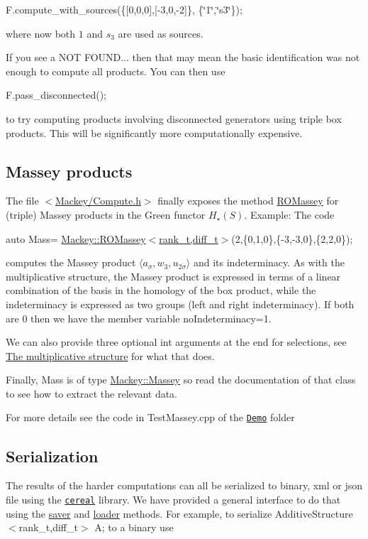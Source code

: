 {\ttfamily F.\+compute\+\_\+with\+\_\+sources(\{\mbox{[}0,0,0\mbox{]},\mbox{[}-\/3,0,-\/2\mbox{]}\}, \{\char`\"{}1\char`\"{},\char`\"{}s3\char`\"{}\});}

where now both $1$ and $s_3$ are used as sources.

If you see a {\ttfamily N\+OT F\+O\+U\+ND...} then that may mean the basic identification was not enough to compute all products. You can then use

{\ttfamily F.\+pass\+\_\+disconnected();}

to try computing products involving disconnected generators using triple box products. This will be significantly more computationally expensive.\hypertarget{use_step1Mass}{}\subsection{Massey products}\label{use_step1Mass}
The file {\ttfamily $<$\hyperlink{Compute_8h}{Mackey/\+Compute.\+h}$>$} finally exposes the method \hyperlink{namespaceMackey_ab75d7bcfa2d92d01bea0d5eef9f48398}{R\+O\+Massey} for (triple) Massey products in the Green functor $H_{\star}(S)$. Example\+: The code

{\ttfamily auto Mass= \hyperlink{namespaceMackey_ab75d7bcfa2d92d01bea0d5eef9f48398}{Mackey\+::\+R\+O\+Massey$<$rank\+\_\+t,diff\+\_\+t$>$}(2,\{0,1,0\},\{-\/3,-\/3,0\},\{2,2,0\});}

computes the Massey product $\langle a_{\sigma},w_3,u_{2\sigma}\rangle $ and its indeterminacy. As with the multiplicative structure, the Massey product is expressed in terms of a linear combination of the basis in the homology of the box product, while the indeterminacy is expressed as two groups (left and right indeterminacy). If both are $0$ then we have the member variable {\ttfamily no\+Indeterminacy=1}.

We can also provide three optional {\ttfamily int} arguments at the end for selections, see \hyperlink{use_step1mult}{The multiplicative structure} for what that does.

Finally, {\ttfamily Mass} is of type {\ttfamily \hyperlink{classMackey_1_1Massey}{Mackey\+::\+Massey}} so read the documentation of that class to see how to extract the relevant data.

For more details see the code in Test\+Massey.\+cpp of the \href{https://github.com/NickG-Math/Mackey/tree/master/Demo}{\tt Demo} folder\hypertarget{use_step1Cer}{}\subsection{Serialization}\label{use_step1Cer}
The results of the harder computations can all be serialized to binary, xml or json file using the \href{https://uscilab.github.io/cereal}{\tt cereal} library. We have provided a general interface to do that using the \hyperlink{namespaceMackey_a1824d780ce15f1845e4f87bf056feec9}{saver} and \hyperlink{namespaceMackey_a735958355cdca12e0d312b7e604f28bc}{loader} methods. For example, to serialize {\ttfamily Additive\+Structure$<$rank\+\_\+t,diff\+\_\+t$>$ A;} to a binary use

